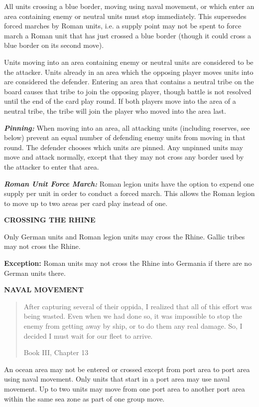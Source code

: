 All units crossing a blue border, moving using naval movement, or which enter an area containing enemy or neutral units must stop immediately. This supersedes forced marches by Roman units, i.e. a supply point may not be spent to force march a Roman unit that has just crossed a blue border (though it could cross a blue border on its second move).

Units moving into an area containing enemy or neutral units are considered to be the attacker. Units already in an area which the opposing player moves units into are considered the defender. Entering an area that contains a neutral tribe on the board causes that tribe to join the opposing player, though battle is not resolved until the end of the card play round. If both players move into the area of a neutral tribe, the tribe will join the player who moved into the area last.

\textbf{\textsl{Pinning:}} When moving into an area, all attacking units (including reserves, see below) prevent an equal number of defending enemy units from moving in that round. The defender chooses which units are pinned. Any unpinned units may move and attack normally, except that they may not cross any border used by the attacker to enter that area.

\textbf{\textsl{Roman Unit Force March:}} Roman legion units have the option to expend one supply per unit in order to conduct a forced march. This allows the Roman legion to move up to two areas per card play instead of one.

\textbf{CROSSING THE RHINE}
\par
Only German units and Roman legion units may cross the Rhine. Gallic tribes may not cross the Rhine.

\textbf{Exception:} Roman units may not cross the Rhine into Germania if there are no German units there.

\textbf{NAVAL MOVEMENT}
\blockquote[Book III, Chapter 13]{After capturing several of their oppida, I realized that all of this effort was being wasted. Even when we had done so, it was impossible to stop the enemy from getting away by ship, or to do them any real damage. So, I decided I must wait for our fleet to arrive.}
\par
An ocean area may not be entered or crossed except from port area to port area using naval movement. Only units that start in a port area may use naval movement. Up to two units may move from one port area to another port area within the same sea zone as part of one group move.

